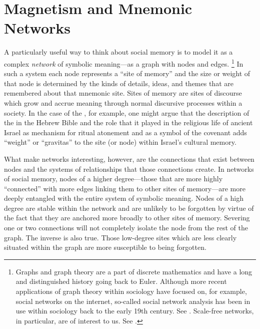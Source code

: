 \section{Magnetism and Mnemonic Networks}

A particularly useful way to think about social memory is to model it as a complex \emph{network} of symbolic meaning---as a graph with nodes and edges.%
    \footnote{Graphs and graph theory are a part of discrete mathematics and have a long and distinguished history going back to Euler. Although more recent applications of graph theory within sociology have focused on, for example, social networks on the internet, so-called social network analysis has been in use within sociology back to the early 19th century. See \cite[10--16]{linton2004}. Scale-free networks, in particular, are of interest to us. See \cite{barabasi_science2009}.}
In such a system each node represents a ``site of memory'' and the size or weight of that node is determined by the kinds of details, ideas, and themes that are remembered about that mnemonic site. Sites of memory are sites of discourse which grow and accrue meaning through normal discursive processes within a society. In the case of the \temple, for example, one might argue that the description of the \temple in the Hebrew Bible and the role that it played in the religious life of ancient Israel as mechanism for ritual atonement and as a symbol of the covenant adds ``weight'' or ``gravitas'' to the site (or node) within Israel's cultural memory. 

What make networks interesting, however, are the connections that exist between nodes and the systems of relationships that those connections create. In networks of social memory, nodes of a higher degree---those that are more highly ``connected'' with more edges linking them to other sites of memory---are more deeply entangled with the entire system of symbolic meaning. Nodes of a high degree are stable within the network and are unlikely to be forgotten by virtue of the fact that they are anchored more broadly to other sites of memory. Severing one or two connections will not completely isolate the node from the rest of the graph. The inverse is also true. Those low-degree sites which are less clearly situated within the graph are more susceptible to being forgotten.

